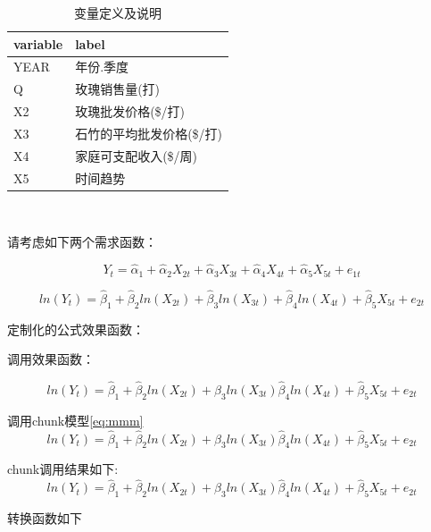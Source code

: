 \documentclass[12pt,(landscape,a4paper),(portrait,a4paper)]{article}
\begin{document}
\begin{table}

\caption{\label{tab:label-show}变量定义及说明}
\centering
\begin{tabular}[t]{l|l}
\hline
variable & label\\
\hline
YEAR & 年份.季度\\
\hline
Q & 玫瑰销售量(打)\\
\hline
X2 & 玫瑰批发价格(\$/打)\\
\hline
X3 & 石竹的平均批发价格(\$/打)\\
\hline
X4 & 家庭可支配收入(\$/周)\\
\hline
X5 & 时间趋势\\
\hline
\end{tabular}
\end{table}

~

请考虑如下两个需求函数：

\begin{equation}
Y_t=\hat{\alpha}_1+\hat{\alpha}_2X_{2t}+\hat{\alpha}_3X_{3t}+
\hat{\alpha}_4X_{4t}+\hat{\alpha}_5X_{5t}+e_{1t}
\label{eq:model1}
\end{equation}

\begin{equation}
ln(Y_t)=\hat{\beta}_1+\hat{\beta}_2ln(X_{2t})+\hat{\beta}_3ln(X_{3t})+\hat{\beta}_4ln(X_{4t})+\hat{\beta}_5X_{5t}+e_{2t}
\label{eq:model2}
\end{equation}

定制化的公式效果函数：

调用效果函数：

\begin{equation*}
ln(Y_t)=\hat{\beta}_1+\hat{\beta}_2ln(X_{2t})+\hat{\beta}_3ln(X_{3t})\hat{\beta}_4ln(X_{4t})+\hat{\beta}_5X_{5t}+e_{2t}
\label{eq:mathtext1}
\end{equation*}

调用chunk模型\eqref{eq:mmm} \begin{equation}
ln(Y_t)=\hat{\beta}_1+\hat{\beta}_2ln(X_{2t})+\hat{\beta}_3ln(X_{3t})\hat{\beta}_4ln(X_{4t})+\hat{\beta}_5X_{5t}+e_{2t}
\label{eq:mmm}
\end{equation}

chunk调用结果如下: \begin{equation}
ln(Y_t)=\hat{\beta}_1+\hat{\beta}_2ln(X_{2t})+\hat{\beta}_3ln(X_{3t})\hat{\beta}_4ln(X_{4t})+\hat{\beta}_5X_{5t}+e_{2t}
\label{eq:mmm}
\end{equation}

转换函数如下
\end{document}
